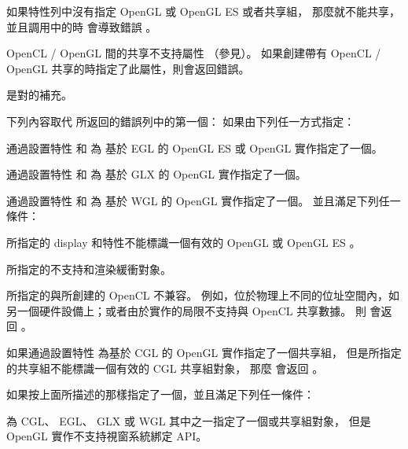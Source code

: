 如果特性列中沒有指定 OpenGL 或 OpenGL ES 或者共享組，
那麼就不能共享，
並且調用\insection[clShareGl]中的時
會導致錯誤 。

OpenCL / OpenGL 間的共享不支持屬性 
 （參見）。
如果創建帶有 OpenCL / OpenGL 共享的時指定了此屬性，則會返回錯誤。

是對的補充。

{}

下列內容取代  所返回的錯誤列中的第一個：
\startreplacepar
如果由下列任一方式指定：
\startigBase[indentnext=no]
\item 通過設置特性  和  為
基於 EGL 的 OpenGL ES 或 OpenGL 實作指定了一個。

\item 通過設置特性  和  為
基於 GLX 的 OpenGL 實作指定了一個。

\item 通過設置特性  和  為
基於 WGL 的 OpenGL 實作指定了一個。
\stopigBase
並且滿足下列任一條件：
\startigBase[indentnext=no]
\item 所指定的 display 和特性不能標識一個有效的 OpenGL 或 OpenGL ES 。

\item 所指定的不支持和渲染緩衝對象。

\item 所指定的與所創建的 OpenCL 不兼容。
例如，位於物理上不同的位址空間內，如另一個硬件設備上；或者由於實作的局限不支持與 OpenCL 共享數據。
\stopigBase
則  會返回 。

如果通過設置特性  為基於 CGL 的 OpenGL 實作指定了一個共享組，
但是所指定的共享組不能標識一個有效的 CGL 共享組對象，
那麼  會返回 。

如果按上面所描述的那樣指定了一個，並且滿足下列任一條件：
\startigBase[indentnext=no]
\item 為 CGL、 EGL、 GLX 或 WGL 其中之一指定了一個或共享組對象，
但是 OpenGL 實作不支持視窗系統綁定 API。


